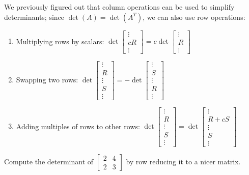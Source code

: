\begin{applicationActivities}
\begin{fact}
We previously figured out that column operations can be used to simplify
determinants; since \(\det(A)=\det(A^T)\), we can also use row operations:
\begin{enumerate}
\item Multiplying rows by scalars:
  \(\det\begin{bmatrix}\vdots\\cR\\\vdots\end{bmatrix}=
  c\det\begin{bmatrix}\vdots\\R\\\vdots\end{bmatrix}\)
\item Swapping two rows:
  \(\det\begin{bmatrix}\vdots\\R\\\vdots\\S\\\vdots\end{bmatrix}=
  -\det\begin{bmatrix}\vdots\\S\\\vdots\\R\\\vdots\end{bmatrix}\)
\item Adding multiples of rows to other rows:
  \(\det\begin{bmatrix}\vdots\\R\\\vdots\\S\\\vdots\end{bmatrix}=
  \det\begin{bmatrix}\vdots\\R+cS\\\vdots\\S\\\vdots\end{bmatrix}\)
\end{enumerate}
\end{fact}

\begin{activity}{10}
  Compute the determinant of $\begin{bmatrix} 2 & 4 \\ 2 & 3 \end{bmatrix}$ by row reducing it to a nicer matrix. \\


\end{activity}
\end{applicationActivities}
